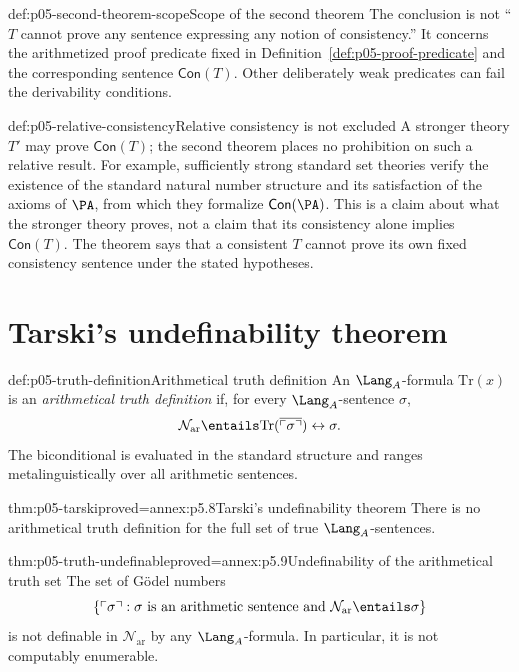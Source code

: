 \begin{hbwarning}{def:p05-second-theorem-scope}{Scope of the second theorem}
The conclusion is not ``\(T\) cannot prove any sentence expressing any
notion of consistency.''  It concerns the arithmetized proof predicate
fixed in Definition~\ref{def:p05-proof-predicate} and the corresponding
sentence \(\mathsf{Con}(T)\).  Other deliberately weak predicates can
fail the derivability conditions.
\end{hbwarning}

\begin{hbexample}{def:p05-relative-consistency}{Relative consistency is not excluded}
A stronger theory \(T'\) may prove \(\mathsf{Con}(T)\); the second
theorem places no prohibition on such a relative result.  For example,
sufficiently strong standard set theories verify the existence of the
standard natural number structure and its satisfaction of the axioms of
\(\PA\), from which they formalize \(\mathsf{Con}(\PA)\).  This is a
claim about what the stronger theory proves, not a claim that its
consistency alone implies \(\mathsf{Con}(T)\).  The theorem says that a
consistent \(T\) cannot prove its own fixed consistency sentence under
the stated hypotheses.
\end{hbexample}

\section{Tarski's undefinability theorem}
\label{sec:p05-provability-truth-04}

\begin{hbdefinition}{def:p05-truth-definition}{Arithmetical truth definition}
An \(\Lang_A\)-formula \(\mathrm{Tr}(x)\) is an \emph{arithmetical truth
definition} if, for every \(\Lang_A\)-sentence \(\sigma\),
\[
  \mathcal N_{\mathrm{ar}}\entails
  \mathrm{Tr}(\overline{\ulcorner\sigma\urcorner})
  \leftrightarrow\sigma.
\]
The biconditional is evaluated in the standard structure and ranges
metalinguistically over all arithmetic sentences.
\end{hbdefinition}

\begin{hbtheorem}{thm:p05-tarski}{proved=annex:p5.8}{Tarski's undefinability theorem}
There is no arithmetical truth definition for the full set of true
\(\Lang_A\)-sentences.
\end{hbtheorem}

\begin{hbcorollary}{thm:p05-truth-undefinable}{proved=annex:p5.9}{Undefinability of the arithmetical truth set}
The set of G\"odel numbers
\[
  \{\ulcorner\sigma\urcorner:
  \sigma\text{ is an arithmetic sentence and }
  \mathcal N_{\mathrm{ar}}\entails\sigma\}
\]
is not definable in \(\mathcal N_{\mathrm{ar}}\) by any \(\Lang_A\)-formula.  In
particular, it is not computably enumerable.
\end{hbcorollary}

